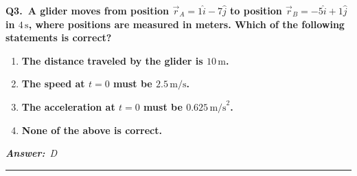 \documentclass[11pt]{article}
\newcommand{\QuestionStyle}[1]{{\large\bfseries\boldmath #1}}
\newcommand{\AnswerStyle}[1]{{\large\bfseries\boldmath #1}}
\newcommand{\ReasonStyle}[1]{{\normalsize #1}}
\newif\ifshowreason
\newcommand{\Correct}[2]{%
  \item \AnswerStyle{\textcolor{AnsRed}{#1}}%
  \ifshowreason\\[-0.2em]
    \ReasonStyle{\textcolor{AnsRed}{#2}}%
  \fi
}
\newcommand{\Wrong}[2]{%
  \item \AnswerStyle{\textcolor{WrongBlue}{#1}}%
  \ifshowreason\\[-0.2em]
    \ReasonStyle{\textcolor{WrongBlue}{#2}}%
  \fi
}
\newcommand{\QBlock}[4]{%
  \Needspace{8\baselineskip}%
  \noindent
  \begin{minipage}{\linewidth}
    \QuestionStyle{#1.~#2}

    \vspace{0.25em}
    \begin{enumerate}
      #3
    \end{enumerate}

    \vspace{0.1em}
    \noindent\textcolor{AnsRed}{\textit{\textbf{Answer:}~#4}}

    \vspace{0.25em}
    \hrule height 0.4pt
  \end{minipage}
  \vspace{0.75em}
}
\begin{document}
\QBlock{Q3}{A glider moves from position $\vec r_A = 1\hat i - 7\hat j$ to position $\vec r_B = -5\hat i + 1\hat j$ in $4\,\text{s}$, where positions are measured in meters. Which of the following statements is correct?}{
\Wrong{The distance traveled by the glider is $10\,\text{m}$.}{This confuses the magnitude of displacement with the actual path length traveled. From initial and final positions alone, the total distance traveled cannot be determined.}
\Wrong{The speed at $t=0$ must be $2.5\,\text{m/s}$.}{This incorrectly treats displacement magnitude divided by time as the instantaneous speed at the start. The given data are only enough to find an average based on displacement, not the speed at $t=0$.}
\Wrong{The acceleration at $t=0$ must be $0.625\,\text{m/s}^2$.}{This invents an instantaneous acceleration from only two positions and one time interval. That information is insufficient to determine acceleration at a specific instant.}
\Correct{None of the above is correct.}{The displacement is $\Delta\vec r=\vec r_B-\vec r_A=(-6)\hat i+8\hat j$, so its magnitude is $|\Delta\vec r|=\sqrt{(-6)^2+8^2}=\sqrt{100}=10\,\text{m}$. However, that value is the displacement magnitude, not necessarily the distance traveled, and neither the instantaneous speed at $t=0$ nor the instantaneous acceleration at $t=0$ can be deduced from the given information alone. Therefore none of A, B, or C must be true.}
}{D}
\end{document}
